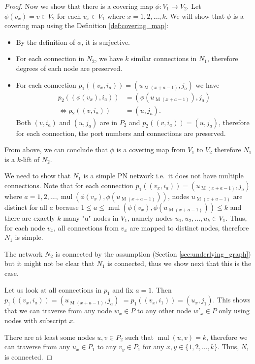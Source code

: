 \begin{proof}
    Now we show that there is a covering map $\phi: V_1 \rightarrow V_2$.
    Let $\phi(v_x) = v \in V_2$ for each $v_x \in V_1$ where $x=1, 2, ..., k$.
    We will show that $\phi$ is a covering map using the Definition \ref{def:covering_map}:
    \begin{itemize}
        \item By the definition of $\phi$, it is surjective.
        \item For each connection in $N_2$, we have $k$ similar connections in $N_1$, therefore degrees of each node are preserved.
        \item For each connection $p_1((v_{x}, i_a)) = (u_{\operatorname{M}(x+a-1)}, j_a)$ we have
        \begin{align*}
           p_2((\phi(v_{x}), i_a)) &= (\phi(u_{\operatorname{M}(x+a-1)}), j_a)\\
           \Leftrightarrow p_2((v, i_a)) &= (u, j_a).
        \end{align*}
        Both $(v, i_a)$ and $(u, j_a)$ are in $P_2$ and $p_2((v, i_a)) = (u, j_a)$, therefore for each connection, the port numbers and connections are preserved.
    \end{itemize}
    From above, we can conclude that $\phi$ is a covering map from $V_1$ to $V_2$
    therefore $N_1$ is a $k$-lift of $N_2$.

    We need to show that $N_1$ is a simple PN network i.e.\ it does not have multiple connections.
    Note that for each connection $p_1((v_{x}, i_a)) = (u_{\operatorname{M}(x+a-1)}, j_a)$ where $a=1, 2, ..., \operatorname{mul}(\phi(v_{x}),\phi(u_{\operatorname{M}(x+a-1)}))$, nodes $u_{\operatorname{M}(x+a-1)}$ are distinct for all $a$ because $1 \leq a \leq \operatorname{mul}(\phi(v_{x}),\phi(u_{\operatorname{M}(x+a-1)})) \leq k$ and
    there are exactly $k$ many "u" nodes in $V_1$, namely nodes $u_1, u_2, ..., u_k \in V_1$.
    Thus, for each node $v_x$, all connections from $v_x$ are mapped to distinct nodes, therefore $N_1$ is simple.

    The network $N_2$ is connected by the assumption (Section \ref{sec:underlying_graph}) but it might not be clear that $N_1$ is connected, thus we show next that this is the case.

    Let us look at all connections in $p_1$ and fix $a=1$.
    Then $p_1((v_{x}, i_a)) = (u_{\operatorname{M}(x+a-1)}, j_a)$
    $=p_1((v_{x}, i_1)) = (u_{x}, j_1)$.
    This shows that we can traverse from any node $w_x\in P$ to any other node $w'_x\in P$ only using nodes with subscript $x$.

    There are at least some nodes $u, v \in P_2$ such that $\operatorname{mul}(u,v) = k$, therefore we can traverse from any $u_x \in P_1$ to any $v_y \in P_1$ for any $x, y \in \{1, 2, ..., k\}$.
    Thus, $N_1$ is connected.
\end{proof}


